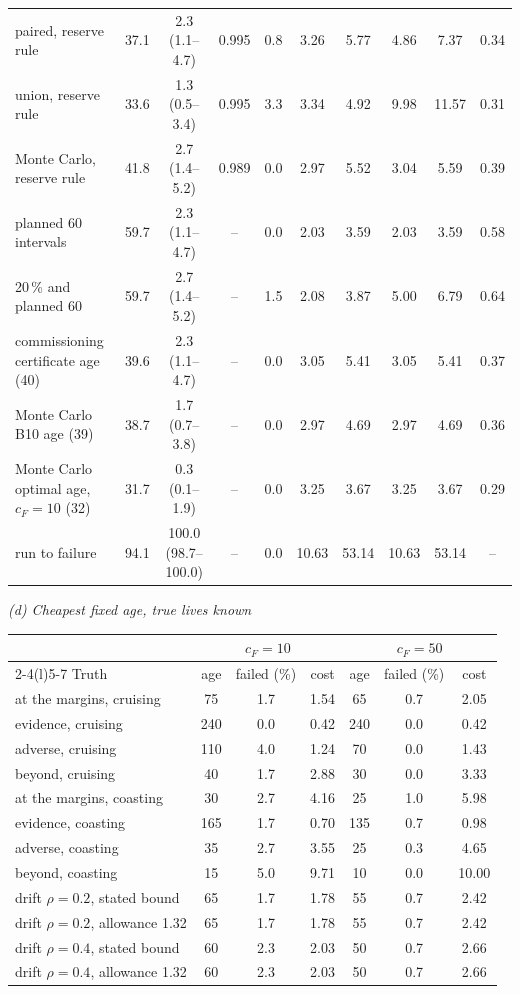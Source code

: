 \begin{table}[htbp]
\begin{tabular*}{\textwidth}{@{\extracolsep{\fill}}lccccccccc@{}}
paired, reserve rule & 37.1 & 2.3 (1.1--4.7) & 0.995 & 0.8 & 3.26 & 5.77 & 4.86 & 7.37 & 0.34 \\
union, reserve rule & 33.6 & 1.3 (0.5--3.4) & 0.995 & 3.3 & 3.34 & 4.92 & 9.98 & 11.57 & 0.31 \\
Monte Carlo, reserve rule & 41.8 & 2.7 (1.4--5.2) & 0.989 & 0.0 & 2.97 & 5.52 & 3.04 & 5.59 & 0.39 \\
planned 60 intervals & 59.7 & 2.3 (1.1--4.7) & -- & 0.0 & 2.03 & 3.59 & 2.03 & 3.59 & 0.58 \\
20\,\% and planned 60 & 59.7 & 2.7 (1.4--5.2) & -- & 1.5 & 2.08 & 3.87 & 5.00 & 6.79 & 0.64 \\
commissioning certificate age (40) & 39.6 & 2.3 (1.1--4.7) & -- & 0.0 & 3.05 & 5.41 & 3.05 & 5.41 & 0.37 \\
Monte Carlo B10 age (39) & 38.7 & 1.7 (0.7--3.8) & -- & 0.0 & 2.97 & 4.69 & 2.97 & 4.69 & 0.36 \\
Monte Carlo optimal age, $c_F=10$ (32) & 31.7 & 0.3 (0.1--1.9) & -- & 0.0 & 3.25 & 3.67 & 3.25 & 3.67 & 0.29 \\
run to failure & 94.1 & 100.0 (98.7--100.0) & -- & 0.0 & 10.63 & 53.14 & 10.63 & 53.14 & -- \\
\bottomrule
\end{tabular*}

\medskip
\textit{(d) Cheapest fixed age, true lives known}\\[2pt]
\begin{tabular*}{\textwidth}{@{\extracolsep{\fill}}lcccccc@{}}
\toprule
& \multicolumn{3}{c}{$c_F=10$} & \multicolumn{3}{c}{$c_F=50$} \\
\cmidrule(lr){2-4}\cmidrule(l){5-7}
Truth & age & failed (\%) & cost & age & failed (\%) & cost \\
\midrule
at the margins, cruising & 75 & 1.7 & 1.54 & 65 & 0.7 & 2.05 \\
evidence, cruising & 240 & 0.0 & 0.42 & 240 & 0.0 & 0.42 \\
adverse, cruising & 110 & 4.0 & 1.24 & 70 & 0.0 & 1.43 \\
beyond, cruising & 40 & 1.7 & 2.88 & 30 & 0.0 & 3.33 \\
at the margins, coasting & 30 & 2.7 & 4.16 & 25 & 1.0 & 5.98 \\
evidence, coasting & 165 & 1.7 & 0.70 & 135 & 0.7 & 0.98 \\
adverse, coasting & 35 & 2.7 & 3.55 & 25 & 0.3 & 4.65 \\
beyond, coasting & 15 & 5.0 & 9.71 & 10 & 0.0 & 10.00 \\
drift $\rho=0.2$, stated bound & 65 & 1.7 & 1.78 & 55 & 0.7 & 2.42 \\
drift $\rho=0.2$, allowance 1.32 & 65 & 1.7 & 1.78 & 55 & 0.7 & 2.42 \\
drift $\rho=0.4$, stated bound & 60 & 2.3 & 2.03 & 50 & 0.7 & 2.66 \\
drift $\rho=0.4$, allowance 1.32 & 60 & 2.3 & 2.03 & 50 & 0.7 & 2.66 \\
\bottomrule
\end{tabular*}
\end{table}
